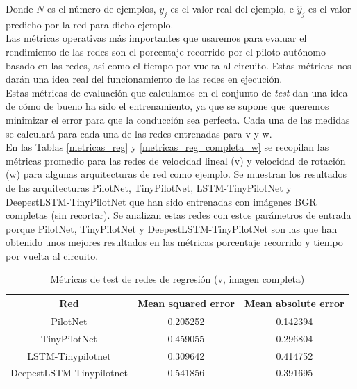 Donde \(N\) es el número de ejemplos, \(y_j\) es el valor real del ejemplo, e \(\hat{y}_j\) es el valor predicho por la red para dicho ejemplo.\\

Las métricas operativas más importantes que usaremos para evaluar el rendimiento de las redes son el porcentaje recorrido por el piloto autónomo basado en las redes, así como el tiempo por vuelta al circuito. Estas métricas nos darán una idea real del funcionamiento de las redes en ejecución.\\

Estas métricas de evaluación que calculamos en el conjunto de \textit{test} dan una idea de cómo de bueno ha sido el entrenamiento, ya que se supone que queremos minimizar el error para que la conducción sea perfecta. Cada una de las medidas se calculará para cada una de las redes entrenadas para v y w.\\


En las Tablas \ref{metricas_reg} y \ref{metricas_reg_completa_w} se recopilan las métricas promedio para las redes de velocidad lineal (v) y velocidad de rotación (w) para algunas arquitecturas de red como ejemplo. Se muestran los resultados de las arquitecturas PilotNet, TinyPilotNet, LSTM-TinyPilotNet y DeepestLSTM-TinyPilotNet que han sido entrenadas con imágenes BGR completas (sin recortar). Se analizan estas redes con estos parámetros de entrada porque PilotNet, TinyPilotNet y DeepestLSTM-TinyPilotNet son las que han obtenido unos mejores resultados en las métricas porcentaje recorrido y tiempo por vuelta al circuito. \\

\begin{table}[H]
\centering
\caption{Métricas de test de redes de regresión (v, imagen completa)}
\label{metricas_reg_completa_v}
\begin{tabular}{c|c|c|}
\cline{1-3}
                        \multicolumn{1}{|c|}{Red}    & Mean squared error       & Mean absolute error             \\ \hline
\multicolumn{1}{|c|}{PilotNet}    & 0.205252    & 0.142394    \\ \hline
\multicolumn{1}{|c|}{TinyPilotNet}     & 0.459055      & 0.296804   \\ \hline
\multicolumn{1}{|c|}{LSTM-Tinypilotnet}     & 0.309642    & 0.414752        \\ \hline
\multicolumn{1}{|c|}{DeepestLSTM-Tinypilotnet}     & 0.541856   & 0.391695    \\ \hline
\end{tabular}
\end{table}


